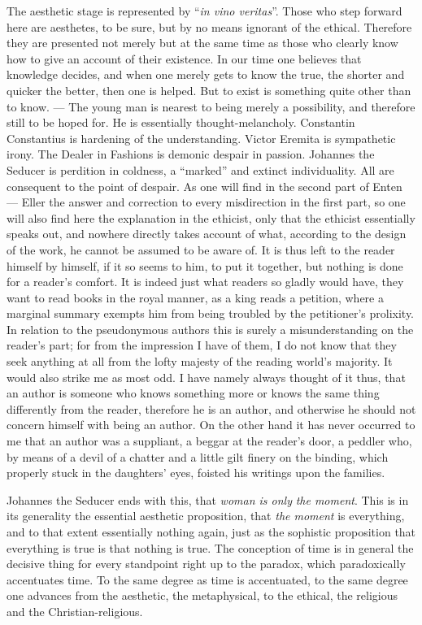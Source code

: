 \documentclass[12pt,a4paper,openany]{book}
\newcommand{\opage}[1]{\marginnote{\footnotesize\textit{[#1]}}}
\begin{document}
The aesthetic stage is represented by ``\textit{in vino veritas}''. Those who step
forward here are aesthetes, to be sure, but by no means ignorant of the ethical.
Therefore they are presented not merely but at the same time as those who clearly know
how to give an account of their existence. In our time one believes that knowledge
decides, and when one merely gets to know the true, the shorter and quicker the better,
then one is helped. But to exist is something quite other than to know. --- The young
man is nearest to being merely a possibility, and therefore still to be hoped for. He
is essentially thought-melancholy. Constantin Constantius is hardening of the
understanding. Victor Eremita is sympathetic irony. The Dealer in Fashions is demonic
despair in passion. Johannes the Seducer is perdition in coldness, a ``marked'' and
extinct individuality. All are consequent to the point of despair. As one will find in
the second part of Enten --- Eller the answer and correction to every misdirection in
the first part, so one will also find here the explanation in the ethicist, only that
the ethicist essentially speaks out, and nowhere directly takes account of what,
according to the design of the work, he cannot be assumed to be aware of. It is thus
left to the reader himself by himself, if it so seems to him, to put it together, but
nothing is done for a reader's comfort. It is indeed just what readers so gladly would
have, they want to read books in the royal manner, as a king reads a petition, where a
marginal summary exempts him from being troubled by the petitioner's prolixity. In
relation to the pseudonymous authors this is surely a misunderstanding on the reader's
part; for from the impression I have of them, I do not know that they seek anything at
all from the lofty majesty of the reading world's majority.
\setcounter{footnote}{0}%
\opage{197}It would also strike me as most odd. I have namely always thought of it thus, that
an author is someone who knows something more or knows the same thing differently from
the reader, therefore he is an author, and otherwise he should not concern himself with
being an author. On the other hand it has never occurred to me that an author was a
suppliant, a beggar at the reader's door, a peddler who, by means of a devil of a
chatter and a little gilt finery on the binding, which properly stuck in the daughters'
eyes, foisted his writings upon the families.

Johannes the Seducer ends with this, that \emph{woman is only}
\emph{the moment}. This is in its generality the essential aesthetic proposition, that
\emph{the moment} is everything, and to that extent essentially nothing again, just as
the sophistic proposition that everything is true is that nothing is true. The
conception of time is in general the decisive thing for every standpoint right up to
the paradox, which paradoxically accentuates time. To the same degree as time is
accentuated, to the same degree one advances from the aesthetic, the metaphysical, to
the ethical, the religious and the Christian-religious.
\end{document}
